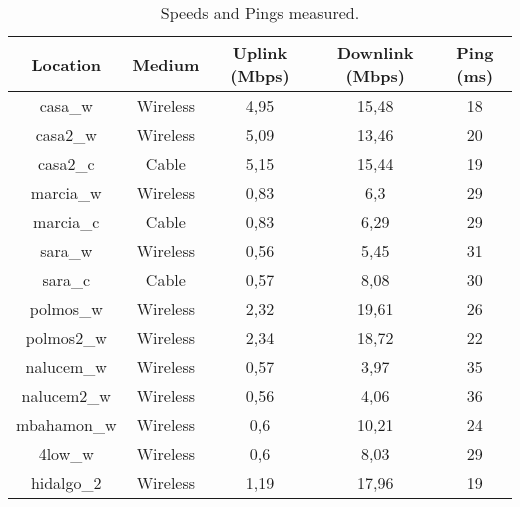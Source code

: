 \begin{table}[ht]
\begin{center}
\begin{tabular}{|c||c|c|c|c|}
\hline
Location  & Medium  & Uplink (Mbps) & Downlink (Mbps) & Ping (ms)\\ \hline\hline
 casa\_w     & Wireless & 4,95           & 15,48         & 18 \\ \hline       %
 casa2\_w    & Wireless & 5,09           & 13,46         & 20 \\ \hline       %
 casa2\_c    & Cable    & 5,15           & 15,44         & 19 \\ \hline       %
 marcia\_w	& Wireless & 0,83	        &  6,3			& 29 \\ \hline
 marcia\_c	& Cable    & 0,83	        &  6,29	        & 29 \\ \hline
 sara\_w	    & Wireless & 0,56	        &  5,45	        & 31 \\ \hline
 sara\_c	    & Cable    & 0,57	        &  8,08	        & 30 \\ \hline
 polmos\_w   & Wireless & 2,32           & 19,61         & 26 \\ \hline       %
 polmos2\_w  & Wireless & 2,34           & 18,72         & 22 \\ \hline       %
 nalucem\_w  & Wireless & 0,57           & 3,97          & 35 \\ \hline       %
 nalucem2\_w & Wireless & 0,56           & 4,06          & 36 \\ \hline       %
 mbahamon\_w & Wireless & 0,6            & 10,21         & 24 \\ \hline       %
 4low\_w     & Wireless & 0,6            & 8,03          & 29 \\ \hline       %
 hidalgo\_2  & Wireless & 1,19           & 17,96         & 19 \\ \hline       %
\end{tabular}
\end{center}
\caption[Speed Test: Speeds and Ping measured]{Speeds and Pings measured. }
\label{table:speeds}
\end{table}

